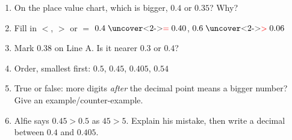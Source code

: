 \documentclass{beamer}
\newcommand{\ashow}[1]{\uncover<2->{\textcolor{red}{\small #1}}}
\begin{document}
\begin{frame}
\begin{columns}[T]
\begin{multicols}{2}
\begin{enumerate}
  \item On the place value chart, which is bigger, $0.4$ or $0.35$? Why? \ashow{$0.4$: $4$ tenths is greater than $3$ tenths}

  \item Fill in $<$, $>$ or $=$ $0.4 \mathrel{\text{\ashow{$=$}}} 0.40$, $0.6 \mathrel{\text{\ashow{$>$}}} 0.06$

\vspace{0.5em}

  \item Mark $0.38$ on Line A. Is it nearer $0.3$ or $0.4$? \ashow{nearer $0.4$}

  \columnbreak

  \item Order, smallest first: $0.5$, $0.45$, $0.405$, $0.54$ \ashow{$0.405$, $0.45$, $0.5$, $0.54$}

  \vspace{0.2em}

  \item True or false: more digits \emph{after} the decimal point means a bigger number? Give an example/counter-example. \ashow{False: $0.9>0.1234$}

  \vspace{0.2em}

  \item Alfie says $0.45>0.5$ as $45>5$. Explain his mistake, then write a decimal between $0.4$ and $0.405$. \ashow{$0.5$ has $5$ tenths; e.g.\ $0.402$}

\end{enumerate}
\end{multicols}

\end{columns}

\end{frame}
\end{document}
